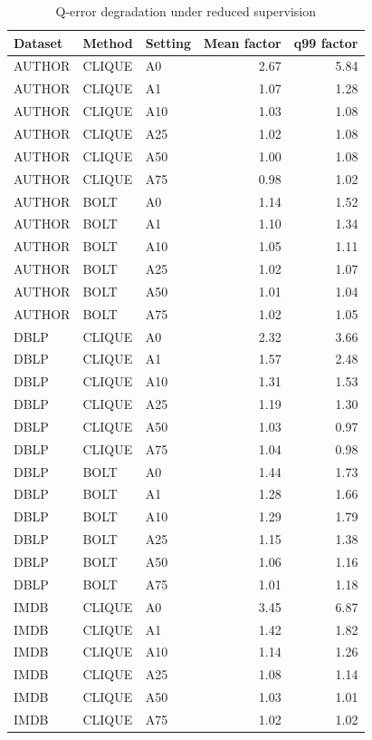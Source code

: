 \begin{table}[H]
\centering
\small
\setlength{\tabcolsep}{5pt}
\caption{Q-error degradation under reduced supervision}
\label{tab:A_degradation}
\begin{tabular}{@{}lllrr@{}}
\toprule
Dataset & Method & Setting & Mean factor & q99 factor \\
\midrule
AUTHOR & CLIQUE & A0 & 2.67 & 5.84 \\
AUTHOR & CLIQUE & A1 & 1.07 & 1.28 \\
AUTHOR & CLIQUE & A10 & 1.03 & 1.08 \\
AUTHOR & CLIQUE & A25 & 1.02 & 1.08 \\
AUTHOR & CLIQUE & A50 & 1.00 & 1.08 \\
AUTHOR & CLIQUE & A75 & 0.98 & 1.02 \\
AUTHOR & BOLT & A0 & 1.14 & 1.52 \\
AUTHOR & BOLT & A1 & 1.10 & 1.34 \\
AUTHOR & BOLT & A10 & 1.05 & 1.11 \\
AUTHOR & BOLT & A25 & 1.02 & 1.07 \\
AUTHOR & BOLT & A50 & 1.01 & 1.04 \\
AUTHOR & BOLT & A75 & 1.02 & 1.05 \\
DBLP & CLIQUE & A0 & 2.32 & 3.66 \\
DBLP & CLIQUE & A1 & 1.57 & 2.48 \\
DBLP & CLIQUE & A10 & 1.31 & 1.53 \\
DBLP & CLIQUE & A25 & 1.19 & 1.30 \\
DBLP & CLIQUE & A50 & 1.03 & 0.97 \\
DBLP & CLIQUE & A75 & 1.04 & 0.98 \\
DBLP & BOLT & A0 & 1.44 & 1.73 \\
DBLP & BOLT & A1 & 1.28 & 1.66 \\
DBLP & BOLT & A10 & 1.29 & 1.79 \\
DBLP & BOLT & A25 & 1.15 & 1.38 \\
DBLP & BOLT & A50 & 1.06 & 1.16 \\
DBLP & BOLT & A75 & 1.01 & 1.18 \\
IMDB & CLIQUE & A0 & 3.45 & 6.87 \\
IMDB & CLIQUE & A1 & 1.42 & 1.82 \\
IMDB & CLIQUE & A10 & 1.14 & 1.26 \\
IMDB & CLIQUE & A25 & 1.08 & 1.14 \\
IMDB & CLIQUE & A50 & 1.03 & 1.01 \\
IMDB & CLIQUE & A75 & 1.02 & 1.02 \\

\end{tabular}
\end{table}
